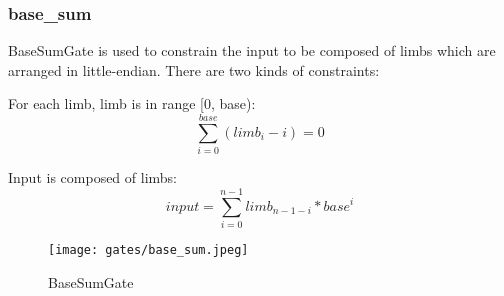 \subsubsection{base\_sum}

BaseSumGate is used to constrain the input to be composed of limbs which are arranged in little-endian. There are two kinds of constraints:

For each limb, limb is in range [0, base):
\[\sum_{i=0}^{base}(limb_i - i) = 0\]

Input is composed of limbs:
\[input = \sum_{i=0}^{n-1} limb_{n-1-i} * base^i\]

\begin{figure}[!ht]
    \centering
    \texttt{[image: gates/base\_sum.jpeg]}
    \caption{BaseSumGate}
    \label{fig:base-sum}
\end{figure}